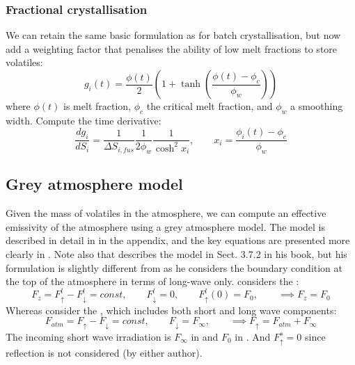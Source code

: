 \subsubsection{Fractional crystallisation}
We can retain the same basic formulation as for batch crystallisation, but now add a weighting factor that penalises the ability of low melt fractions to store volatiles:
\begin{equation}
g_i(t) = \frac{\phi(t)}{2} \left(1+ \tanh\left(\frac{\phi(t)-\phi_c}{\phi_w} \right)\right)
\end{equation}
where $\phi(t)$ is melt fraction, $\phi_c$ the critical melt fraction, and $\phi_w$ a smoothing width.  Compute the time derivative:
\begin{equation}
\frac{d g_i}{d S_i} =\frac{1}{\Delta S_{i,fus}} \frac{1}{2\phi_w} \frac{1}{\cosh^2{x_i}}, \qquad x_i = \frac{\phi_i(t)-\phi_c}{\phi_w}
\end{equation}
\subsection{Grey atmosphere model}
Given the mass of volatiles in the atmosphere, we can compute an effective emissivity of the atmosphere using a grey atmosphere model.  The model is described in detail in \cite{AM85} in the appendix, and the key equations are presented more clearly in \cite{ET08}.  Note also that \cite{AND10} describes the model in Sect. 3.7.2 in his book, but his formulation is slightly different from \cite{AM85} as he considers the boundary condition at the top of the atmosphere in terms of long-wave only.  \cite{AND10} considers the :
\begin{equation}
F_z = F_{\uparrow}^l - F_{\downarrow}^l = const, \qquad F_{\downarrow}^l=0, \qquad F_\uparrow^l(0)=F_0, \qquad \implies F_z=F_0
\end{equation}
Whereas \cite{AM85} consider the , which includes both short and long wave components:
\begin{equation}
F_{atm} = F_{\uparrow} - F_{\downarrow} = const, \qquad F_{\downarrow}=F_\infty, \qquad \implies F_{\uparrow} = F_{atm} + F_\infty
\end{equation}
The incoming short wave irradiation is $F_\infty$ in \cite{AM85} and $F_0$ in \cite{AND10}.  And $F_{\uparrow}^s=0$ since reflection is not considered (by either author).

